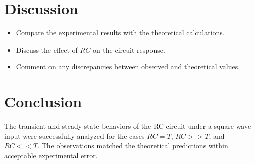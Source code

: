 \documentclass[12pt,a4paper]{article}
\begin{document}
\section*{Discussion}
\begin{itemize}
    \item Compare the experimental results with the theoretical calculations.
    \item Discuss the effect of \(RC\) on the circuit response.
    \item Comment on any discrepancies between observed and theoretical values.
\end{itemize}

\section*{Conclusion}
The transient and steady-state behaviors of the RC circuit under a square wave input were successfully analyzed for the cases \(RC = T\), \(RC >> T\), and \(RC << T\). The observations matched the theoretical predictions within acceptable experimental error.
\end{document}
